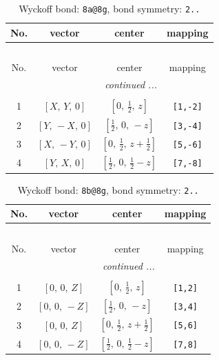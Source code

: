 \documentclass[fleqn,8pt]{jsarticle}
\begin{document}
\begin{longtable}{cccc}
\caption{Wyckoff bond: {\tt 8a@8g}, bond symmetry: {\tt 2..}}
 \\
 \hline \hline
No. & vector & center & mapping \\ \hline \endfirsthead

\multicolumn{3}{l}{\tablename\ \thetable{}} \\
 \hline \hline
No. & vector & center & mapping \\ \hline \endhead

 \hline \hline
\multicolumn{3}{r}{\footnotesize\it continued ...} \\ \endfoot

 \hline \hline
\multicolumn{3}{r}{} \\ \endlastfoot

1 & $\left[ X,\, Y,\, 0 \right]$ & $\left[ 0,\, \frac{1}{2},\, z \right]$ & {\tt [1,-2]} \\ \hline
2 & $\left[ Y,\, - X,\, 0 \right]$ & $\left[ \frac{1}{2},\, 0,\, - z \right]$ & {\tt [3,-4]} \\ \hline
3 & $\left[ X,\, - Y,\, 0 \right]$ & $\left[ 0,\, \frac{1}{2},\, z + \frac{1}{2} \right]$ & {\tt [5,-6]} \\ \hline
4 & $\left[ Y,\, X,\, 0 \right]$ & $\left[ \frac{1}{2},\, 0,\, \frac{1}{2} - z \right]$ & {\tt [7,-8]} \\
\end{longtable}
\renewcommand{\arraystretch}{1.2}
\begin{longtable}{cccc}
\caption{Wyckoff bond: {\tt 8b@8g}, bond symmetry: {\tt 2..}}
 \\
 \hline \hline
No. & vector & center & mapping \\ \hline \endfirsthead

\multicolumn{3}{l}{\tablename\ \thetable{}} \\
 \hline \hline
No. & vector & center & mapping \\ \hline \endhead

 \hline \hline
\multicolumn{3}{r}{\footnotesize\it continued ...} \\ \endfoot

 \hline \hline
\multicolumn{3}{r}{} \\ \endlastfoot

1 & $\left[ 0,\, 0,\, Z \right]$ & $\left[ 0,\, \frac{1}{2},\, z \right]$ & {\tt [1,2]} \\ \hline
2 & $\left[ 0,\, 0,\, - Z \right]$ & $\left[ \frac{1}{2},\, 0,\, - z \right]$ & {\tt [3,4]} \\ \hline
3 & $\left[ 0,\, 0,\, Z \right]$ & $\left[ 0,\, \frac{1}{2},\, z + \frac{1}{2} \right]$ & {\tt [5,6]} \\ \hline
4 & $\left[ 0,\, 0,\, - Z \right]$ & $\left[ \frac{1}{2},\, 0,\, \frac{1}{2} - z \right]$ & {\tt [7,8]} \\
\end{longtable}
\end{document}
